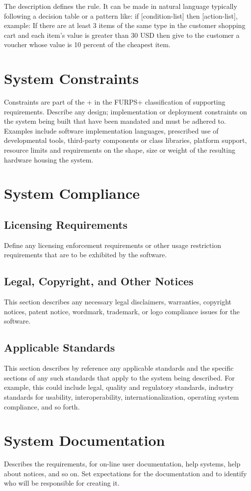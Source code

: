 The description defines the rule. It can be made in natural language typically following a decision table or a pattern like:  if [condition-list] then [action-list], example: 
If there are at least 3 items of the same type in the customer shopping cart and each item’s value is greater than 30 USD then give to the customer a voucher whose value is 10 percent of the cheapest item.


\section{System Constraints}

Constraints are part of the + in the FURPS+ classification of supporting requirements. Describe any design; implementation or deployment constraints on the system being built that have been mandated and must be adhered to. Examples include software implementation languages, prescribed use of developmental tools, third-party components or class libraries, platform support, resource limits and requirements on the shape, size or weight of the resulting hardware housing the system.

\section{System Compliance}

\subsection{Licensing Requirements}

Define any licensing enforcement requirements or other usage restriction requirements that are to be exhibited by the software.

\subsection{Legal, Copyright, and Other Notices}

This section describes any necessary legal disclaimers, warranties, copyright notices, patent notice, wordmark, trademark, or logo compliance issues for the software.

\subsection{Applicable Standards}

This section describes by reference any applicable standards and the specific sections of any such standards that apply to the system being described. For example, this could include legal, quality and regulatory standards, industry standards for usability, interoperability, internationalization, operating system compliance, and so forth.

\section{System Documentation}

Describes the requirements, for on-line user documentation, help systems, help about notices, and so on. Set expectations for the documentation and to identify who will be responsible for creating it.


